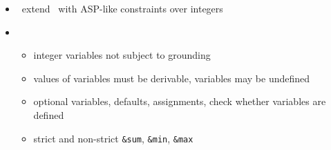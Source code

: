 \begin{frame}{\fclingo}
  \begin{itemize}
  \item {} \ extend \clingo\ with ASP-like constraints over integers
  \item {} \
    \begin{itemize}
    \item integer variables not subject to grounding
    \item values of variables must be derivable, variables may be undefined
    \item optional variables, defaults, assignments, check whether variables are defined
    \item strict and non-strict \lstinline{&sum}, \lstinline{&min}, \lstinline{&max}
    \end{itemize}
  \end{itemize}
\end{frame}
%
